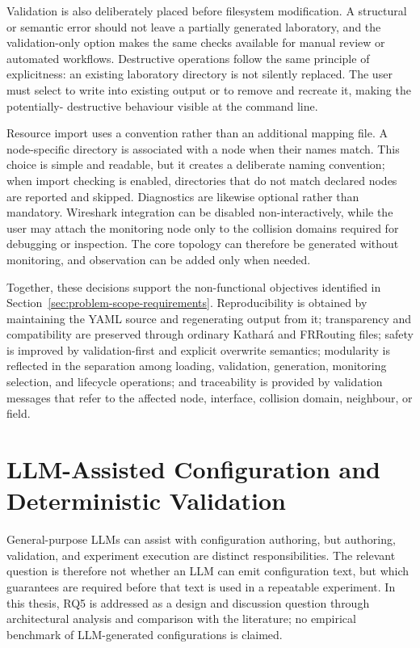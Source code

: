 Validation is also deliberately placed before filesystem modification. A
structural or semantic error should not leave a partially generated
laboratory, and the validation-only option makes the same checks available for
manual review or automated workflows. Destructive operations follow the same
principle of explicitness: an existing laboratory directory is not silently
replaced. The user must select  to write into existing output
or  to remove and recreate it, making the potentially-
destructive behaviour visible at the command line.

Resource import uses a convention rather than an additional mapping file. A
node-specific directory is associated with a node when their names match. This
choice is simple and readable, but it creates a deliberate naming convention;
when import checking is enabled, directories that do not match declared nodes
are reported and skipped. Diagnostics are likewise optional rather than
mandatory. Wireshark integration can be disabled non-interactively, while the
user may attach the monitoring node only to the collision domains required for
debugging or inspection. The core topology can therefore be generated without
monitoring, and observation can be added only when needed.

Together, these decisions support the non-functional objectives identified in
Section~\ref{sec:problem-scope-requirements}. Reproducibility is obtained by maintaining the YAML
source and regenerating output from it; transparency and compatibility are
preserved through ordinary Kathar\'a and FRRouting files; safety is improved by
validation-first and explicit overwrite semantics; modularity is reflected in
the separation among loading, validation, generation, monitoring selection,
and lifecycle operations; and traceability is provided by validation messages
that refer to the affected node, interface, collision domain, neighbour, or
field.


\section{LLM-Assisted Configuration and Deterministic Validation}
\label{sec:llm-role}

General-purpose LLMs can assist with configuration authoring, but authoring,
validation, and experiment execution are distinct responsibilities. The
relevant question is therefore not whether an LLM can emit configuration text,
but which guarantees are required before that text is used in a repeatable
experiment. In this thesis, RQ5 is addressed as a design and discussion
question through architectural analysis and comparison with the literature;
no empirical benchmark of LLM-generated configurations is claimed.

